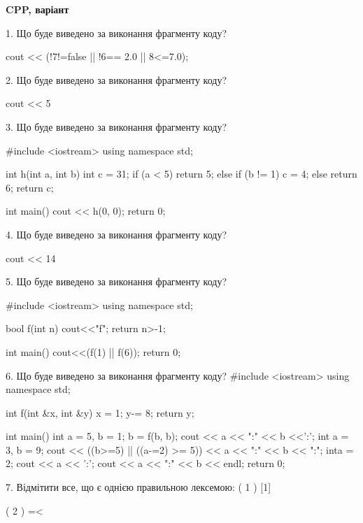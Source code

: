 \documentclass[11pt, ukrainian]{article}
\begin{document}
\begin{large}
\textbf{CPP, варіант }\par

1. Що буде виведено за виконання фрагменту коду?

cout << (!7!=false || !6== 2.0 || 8<=7.0);


2. Що буде виведено за виконання фрагменту коду?

cout << 5 %


3. Що буде виведено за виконання фрагменту коду?

#include <iostream>
using namespace std;

int h(int a, int b){
    int c = 31;
    if (a < 5)
        return 5;
    else if (b != 1)
         c = 4;
    else 
        return 6;
    return c;
}

int main(){
    cout << h(0, 0);
    return 0;
}


4. Що буде виведено за виконання фрагменту коду?

cout << 14 %


5. Що буде виведено за виконання фрагменту коду?

#include <iostream>
using namespace std;

bool f(int n){
    cout<<"f";
    return n>-1;
}

int main(){
    cout<<(f(1) || f(6));
    return 0;
}


6. Що буде виведено за виконання фрагменту коду?
#include <iostream>
using namespace std;

int f(int &x, int &y){
    x = 1;
    y-= 8;
    return y;
}

int main(){
    int a = 5, b = 1;
    b = f(b, b);
    cout << a << ":" << b <<':';
    {
        int a = 3, b = 9;
        cout << ((b>=5) || ((a-=2) >= 5))
             << a << ":" << b << ":";
    }
    {
        inta = 2;
        cout << a << ':';
    }
    cout << a << ":" << b << endl;
    return 0;
}



7. Відмітити все, що є однією правильною лексемою:
( 1 ) [1]

( 2 ) =<


\end{large}
\end{document}
